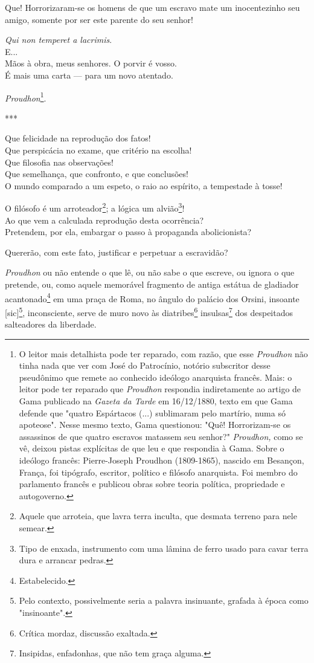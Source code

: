 Que! Horrorizaram-se os homens de que um escravo mate um inocentezinho
seu amigo, somente por ser este parente do seu senhor!

\emph{Qui non temperet a lacrimis}.\\
E...\\
Mãos à obra, meus senhores. O porvir é vosso.\\
É mais uma carta --- para um novo atentado.

\emph{Proudhon}\footnote{O leitor mais detalhista pode ter reparado,
  com razão, que esse \emph{Proudhon} não tinha nada que ver com José do
  Patrocínio, notório subscritor desse pseudônimo que remete ao
  conhecido ideólogo anarquista francês. Mais: o leitor pode ter
  reparado que \emph{Proudhon} respondia indiretamente ao artigo de Gama
  publicado na \emph{Gazeta da Tarde} em 16/12/1880, texto em que Gama
  defende que "quatro Espártacos (...) sublimaram pelo martírio, numa só
  apoteose". Nesse mesmo texto, Gama questionou: "Quê! Horrorizam-se os
  assassinos de que quatro escravos matassem seu senhor?"
  \emph{Proudhon,} como se vê, deixou pistas explícitas de que leu e que
  respondia à Gama. Sobre o ideólogo francês: Pierre-Joseph Proudhon
  (1809-1865), nascido em Besançon, França, foi tipógrafo, escritor,
  político e filósofo anarquista. Foi membro do parlamento francês e
  publicou obras sobre teoria política, propriedade e autogoverno.}.

***

Que felicidade na reprodução dos fatos!\\
Que perspicácia no exame, que critério na escolha!\\
Que filosofia nas observações!\\
Que semelhança, que confronto, e que conclusões!\\
O mundo comparado a um espeto, o raio ao espírito, a tempestade à tosse!

O filósofo é um arroteador\footnote{Aquele que arroteia, que lavra
  terra inculta, que desmata terreno para nele semear.}; a lógica um
alvião\footnote{Tipo de enxada, instrumento com uma lâmina de ferro
  usado para cavar terra dura e arrancar pedras.}!\\
Ao que vem a calculada reprodução desta ocorrência?\\
Pretendem, por ela, embargar o passo à propaganda abolicionista?

Quererão, com este fato, justificar e perpetuar a escravidão?

\emph{Proudhon} ou não entende o que lê, ou não sabe o que escreve, ou
ignora o que pretende, ou, como aquele memorável fragmento de antiga
estátua de gladiador acantonado\footnote{Estabelecido.} em uma praça
de Roma, no ângulo do palácio dos Orsini, insoante {[}sic{]}\footnote{
  Pelo contexto, possivelmente seria a palavra insinuante, grafada à
  época como "insinoante".}, inconsciente, serve de muro novo às
diatribes\footnote{Crítica mordaz, discussão exaltada.}
insulsas\footnote{Insipidas, enfadonhas, que não tem graça alguma.}
dos despeitados salteadores da liberdade.


